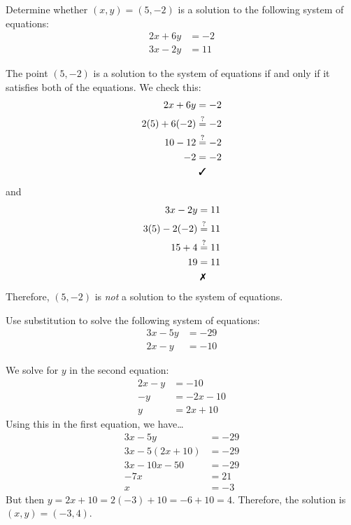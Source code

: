 \documentclass[11pt,letterpaper]{article}
\begin{document}

 Determine whether $(x, y)= (5, -2)$ is a solution to the following system of equations:
	\[
	\begin{aligned}
	2x + 6y&= -2 \\
	3x - 2y&= 11
	\end{aligned}
	\] \pspace

\sol The point $(5, -2)$ is a solution to the system of equations if and only if it satisfies both of the equations. We check this:
	\[
	\begin{aligned}
	2x + 6y&= -2 \\
	2(5) + 6(-2)&\stackrel{?}{=} -2 \\
	10 - 12&\stackrel{?}{=} -2 \\
	-2&= -2 \\
	&\;\text{\cmark}
	\end{aligned}
	\]
and
	\[
	\begin{aligned}
	3x - 2y&= 11 \\
	3(5) - 2(-2)&\stackrel{?}{=} 11 \\
	15 + 4&\stackrel{?}{=} 11 \\
	19&= 11 \\
	&\;\text{\xmark}
	\end{aligned}
	\]
Therefore, $(5, -2)$ is \textit{not} a solution to the system of equations. 



\newpage



 Use substitution to solve the following system of equations:
	\[
	\begin{aligned}
	3x - 5y&= -29 \\
	2x - y&= -10
	\end{aligned}
	\] \pspace

\sol We solve for $y$ in the second equation:
	\[
	\begin{aligned}
	2x - y&= -10 \\[0.3cm]
	-y&= -2x - 10 \\[0.3cm]
	y&= 2x + 10
	\end{aligned}
	\]
Using this in the first equation, we have\dots
	\[
	\begin{aligned}
	3x - 5y&= -29 \\[0.3cm]
	3x - 5(2x + 10)&= -29 \\[0.3cm]
	3x - 10x - 50&= -29 \\[0.3cm]
	-7x&= 21 \\[0.3cm]
	x&= -3
	\end{aligned}
	\]
But then $y= 2x + 10= 2(-3) + 10= -6 + 10= 4$. Therefore, the solution is $(x, y)= (-3, 4)$. 
\end{document}

